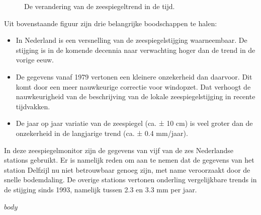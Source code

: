 \documentclass[dutch, biblatex]{deltares_report}
\begin{document}
{\begin{figure}[h]
{}

\caption{De verandering van de zeespiegeltrend in de tijd.}\label{fig:unnamed-chunk-2}
\end{figure}

Uit bovenstaande figuur zijn drie belangrijke boodschappen te halen:

\begin{itemize}
\tightlist
\item
  In Nederland is een versnelling van de zeespiegelstijging waarneembaar. De stijging is in de komende decennia naar verwachting hoger dan de trend in de vorige eeuw.
\item
  De gegevens vanaf 1979 vertonen een kleinere onzekerheid dan daarvoor. Dit komt door een meer nauwkeurige correctie voor windopzet. Dat verhoogt de nauwkeurigheid van de beschrijving van de lokale zeespiegelstijging in recente tijdvakken.
\item
  De jaar op jaar variatie van de zeespiegel (ca. ± 10 cm) is veel groter dan de onzekerheid in de langjarige trend (ca. ± 0.4 mm/jaar).
\end{itemize}

In deze zeespiegelmonitor zijn de gegevens van vijf van de zes Nederlandse stations gebruikt. Er is namelijk reden om aan te nemen dat de gegevens van het station Delfzijl nu niet betrouwbaar genoeg zijn, met name veroorzaakt door de snelle bodemdaling. De overige stations vertonen onderling vergelijkbare trends in de stijging sinds 1993, namelijk tussen 2.3 en 3.3 mm per jaar.
}
\deltarestitle


$body$

\end{document}
